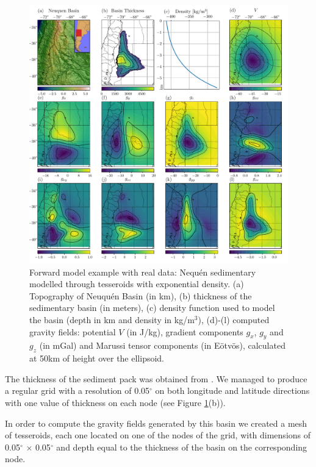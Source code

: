 \documentclass[extra]{gji}
\begin{document}
\begin{figure}
\centering
\includegraphics[width=\linewidth]{figures/neuquen-basin.pdf}
\caption{
    Forward model example with real data: Nequ\'en sedimentary modelled
    through tesseroids with exponential density.
    (a) Topography of Neuqu\'en Basin (in km),
    (b) thickness of the sedimentary basin (in meters),
    (c) density function used to model the basin (depth in km and density in
    kg/m$^3$),
    (d)-(l) computed gravity fields: potential $V$ (in J/kg), gradient
    components $g_x$, $g_y$ and $g_z$ (in mGal) and Marussi tensor components
    (in Eötvös), calculated at 50km of height over the ellipsoid.}
\label{fig:neuquen-basin}
\end{figure}

The thickness of the sediment pack was obtained from \citet{Heine2007}.
We managed to produce a regular grid with a resolution of 0.05$^\circ$ on both
longitude and latitude directions with one value of thickness on each node
(see Figure \ref{fig:neuquen-basin}(b)).

In order to compute the gravity fields generated by this basin we created a
mesh of tesseroids, each one located on one of the nodes of the grid, with
dimensions of 0.05$^\circ$ $\times$ 0.05$^\circ$ and depth equal to the
thickness of the basin on the corresponding node.
\end{document}
